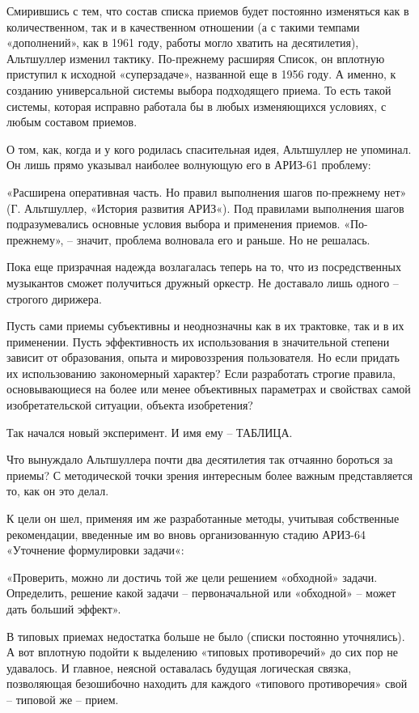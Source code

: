 \documentclass[11pt,a4paper]{article}
\begin{document}
Смирившись с тем, что состав списка приемов будет постоянно изменяться как в
количественном, так и в качественном отношении (а с такими темпами
«дополнений», как в 1961 году, работы могло хватить на десятилетия),
Альтшуллер изменил тактику. По-прежнему расширяя Список, он вплотную приступил
к исходной «суперзадаче», названной еще в 1956 году. А именно, к созданию
универсальной системы выбора подходящего приема. То есть такой системы,
которая исправно работала бы в любых изменяющихся условиях, с любым составом
приемов.

О том, как, когда и у кого родилась спасительная идея, Альтшуллер не
упоминал. Он лишь прямо указывал наиболее волнующую его в АРИЗ-61 проблему:

«Расширена оперативная часть. Но правил выполнения шагов по-прежнему нет»
(Г. Альтшуллер, «История развития АРИЗ«). Под правилами выполнения шагов
подразумевались основные условия выбора и применения приемов. «По-прежнему»,
-- значит, проблема волновала его и раньше. Но не решалась.

Пока еще призрачная надежда возлагалась теперь на то, что из посредственных
музыкантов сможет получиться дружный оркестр. Не доставало лишь одного --
строгого дирижера.

Пусть сами приемы субъективны и неоднозначны как в их трактовке, так и в их
применении. Пусть эффективность их использования в значительной степени
зависит от образования, опыта и мировоззрения пользователя. Но если придать их
использованию закономерный характер? Если разработать строгие правила,
основывающиеся на более или менее объективных параметрах и свойствах самой
изобретательской ситуации, объекта изобретения?

Так начался новый эксперимент. И имя ему -- ТАБЛИЦА.

Что вынуждало Альтшуллера почти два десятилетия так отчаянно бороться за
приемы? С методической точки зрения интересным более важным представляется то,
как он это делал.

К цели он шел, применяя им же разработанные методы, учитывая собственные
рекомендации, введенные им во вновь организованную стадию АРИЗ-64 «Уточнение
формулировки задачи«:

«Проверить, можно ли достичь той же цели решением «обходной»
задачи. Определить, решение какой задачи -- первоначальной или «обходной» --
может дать больший эффект».

В типовых приемах недостатка больше не было (списки постоянно уточнялись). А
вот вплотную подойти к выделению «типовых противоречий» до сих пор не
удавалось. И главное, неясной оставалась будущая логическая связка,
позволяющая безошибочно находить для каждого «типового противоречия» свой --
типовой же -- прием.
\end{document}
